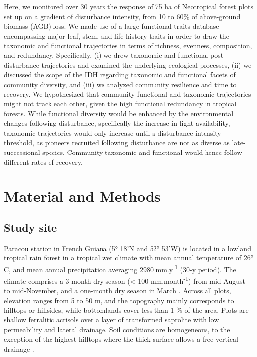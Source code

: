 \documentclass[fleqn,10pt]{ArtEcoFoG} %
\begin{document}
Here, we monitored over 30 years the response of 75 ha of Neotropical forest plots set up on a gradient of disturbance intensity, from 10 to 60\% of above-ground biomass (AGB) loss. We made use of a large functional traits database encompassing major leaf, stem, and life-history traits in order to draw the taxonomic and functional trajectories in terms of richness, evenness, composition, and redundancy.
Specifically, (i) we drew taxonomic and functional post-disturbance trajectories and examined the underlying ecological processes, (ii) we discussed the scope of the IDH regarding taxonomic and functional facets of community diversity, and (iii) we analyzed community resilience and time to recovery.
\color{red}
We hypothesized that community functional and taxonomic trajectories might not track each other, given the high functional redundancy in tropical forests. While functional diversity would be enhanced by the environmental changes following disturbance, specifically the increase in light availability, taxonomic trajectories would only increase until a disturbance intensity threshold, as pioneers recruited following disturbance are not as diverse as late-successional species. Community taxonomic and functional would hence follow different rates of recovery.
\color{black}

\hypertarget{material-and-methods}{%
\section{Material and Methods}\label{material-and-methods}}

\hypertarget{study-site}{%
\subsection{Study site}\label{study-site}}

Paracou station in French Guiana (5° 18'N and 52° 53'W) is located in a lowland tropical rain forest in a tropical wet climate with mean annual temperature of 26° C, and mean annual precipitation averaging 2980 mm.y\textsuperscript{-1} (30-y period).
The climate comprises a 3-month dry season (\textless{} 100 mm.month\textsuperscript{-1}) from mid-August to mid-November, and a one-month dry season in March \citep{Wagner2011}.
Across all plots, elevation ranges from 5 to 50 m, and the topography mainly corresponds to hilltops or hillsides, while bottomlands cover less than 1 \% of the area.
Plots are shallow ferralitic acrisols over a layer of transformed saprolite with low permeability and lateral drainage.
Soil conditions are homogeneous, to the exception of the highest hilltops where the thick surface allows a free vertical drainage \citep{Gourlet-Fleury2004}.
\end{document}
